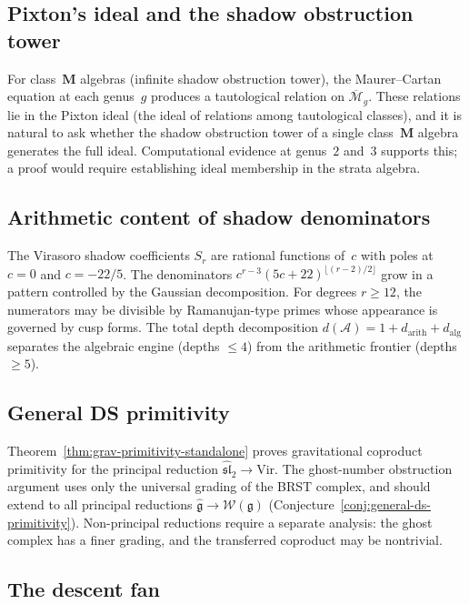 \documentclass[11pt,reqno]{amsart}
\theoremstyle{definition}
\theoremstyle{remark}
\newcommand{\cA}{\mathcal{A}}
\newcommand{\cM}{\mathcal{M}}
\newcommand{\fg}{\mathfrak{g}}
\newcommand{\cW}{\mathcal{W}}
\numberwithin{equation}{section}
\begin{document}
\subsection{Pixton's ideal and the shadow obstruction tower}

For class~$\mathbf{M}$ algebras (infinite shadow obstruction tower), the
Maurer--Cartan equation at each genus~$g$ produces a tautological
relation on $\overline{\cM}_g$. These relations lie in the
Pixton ideal (the ideal of relations among tautological classes),
and it is natural to ask whether the shadow obstruction tower of a single
class~$\mathbf{M}$ algebra generates the full ideal. Computational
evidence at genus~$2$ and~$3$ supports this; a proof would
require establishing ideal membership in the strata algebra.

\subsection{Arithmetic content of shadow denominators}

The Virasoro shadow coefficients $S_r$ are rational functions
of~$c$ with poles at $c = 0$ and $c = -22/5$. The denominators
$c^{r-3}(5c+22)^{\lfloor(r-2)/2\rfloor}$ grow in a pattern
controlled by the Gaussian decomposition. For
degrees $r \ge 12$, the numerators may be divisible by
Ramanujan-type primes whose appearance is governed by cusp
forms. The total depth decomposition
$d(\cA) = 1 + d_{\mathrm{arith}} + d_{\mathrm{alg}}$ separates
the algebraic engine (depths $\le 4$) from the arithmetic frontier
(depths $\ge 5$).

\subsection{General DS primitivity}

Theorem~\ref{thm:grav-primitivity-standalone} proves gravitational
coproduct primitivity for the principal reduction
$\widehat{\mathfrak{sl}}_2 \to \mathrm{Vir}$. The ghost-number
obstruction argument uses only the universal grading of the BRST
complex, and should extend to all principal reductions
$\widehat{\fg} \to \cW(\fg)$
(Conjecture~\ref{conj:general-ds-primitivity}). Non-principal
reductions require a separate analysis: the ghost complex has
a finer grading, and the transferred coproduct may be
nontrivial.

\subsection{The descent fan}
\label{subsec:descent-fan}
\end{document}
